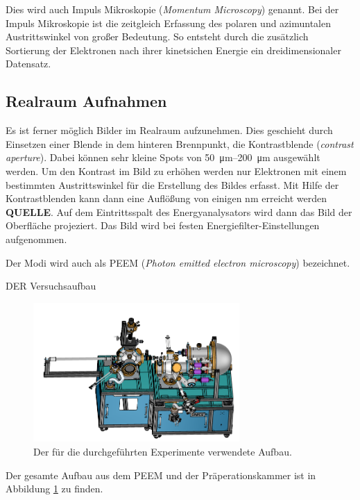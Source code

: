             Dies wird auch Impuls Mikroskopie (\textit{Momentum Microscopy}) genannt.
            Bei der Impuls Mikroskopie ist die zeitgleich Erfassung des polaren und azimuntalen Austrittswinkel von großer Bedeutung. 
            So entsteht durch die zusätzlich Sortierung der Elektronen nach ihrer kinetsichen Energie ein dreidimensionaler Datensatz.

        

        \subsection{Realraum Aufnahmen}
            Es ist ferner möglich Bilder im Realraum aufzunehmen.
            Dies geschieht durch Einsetzen einer Blende in dem hinteren Brennpunkt, die Kontrastblende (\textit{contrast aperture}).
            Dabei können sehr kleine Spots von \SIrange{50}{200}{\micro\meter} ausgewählt werden.
            Um den Kontrast im Bild zu erhöhen werden nur Elektronen mit einem bestimmten Austrittswinkel für die Erstellung des Bildes erfasst.
            Mit Hilfe der Kontrastblenden kann dann eine Auflößung von einigen \si{\nano\meter} erreicht werden \textbf{QUELLE}. 
            Auf dem Eintrittsspalt des Energyanalysators wird dann das Bild der Oberfläche projeziert.
            Das Bild wird bei festen Energiefilter-Einstellungen aufgenommen.

            Der Modi wird auch als PEEM (\textit{Photon emitted electron microscopy}) bezeichnet.

            DER Versuchsaufbau
            \begin{figure}
                \centering
                \includegraphics[width=0.7\textwidth]{./content/MM.png}
                \caption{Der für die durchgeführten Experimente verwendete Aufbau.}
                \label{fig:aufbau}
            \end{figure}
            Der gesamte Aufbau aus dem PEEM und der Präperationskammer ist in Abbildung \ref{fig:aufbau} zu finden.
        


